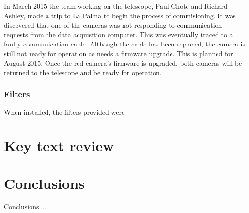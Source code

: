 \documentclass[a4paper,fleqn,usenatbib]{mnras}
\begin{document}
In March 2015 the team working on the telescope, Paul Chote and Richard Ashley, made a trip to La Palma to begin the process of commisioning. It was discovered that one of the cameras was not responding to communication requests from the data acquisition computer. This was eventually traced to a faulty communication cable. Although the cable has been replaced, the camera is still not ready for operation as needs a firmware upgrade. This is planned for August 2015. Once the red camera's firmware is upgraded, both cameras will be returned to the telescope and be ready for operation. 

\subsubsection{Filters}
When installed, the filters provided were 

\section{Key text review}

\section{Conclusions}

Conclusions....















\bsp	%
\label{lastpage}
\end{document}
